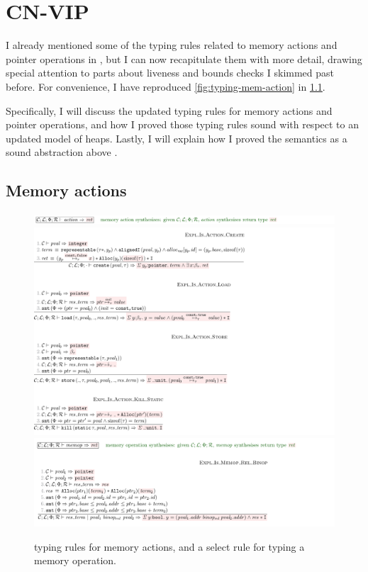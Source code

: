\chapter{CN-VIP}\label{chap:cn-vip}

\margintoc{}

I already mentioned some of the typing rules related to memory actions and
pointer operations in , but I can now
recapitulate them with more detail, drawing special attention to parts about
liveness and bounds checks I skimmed past before. For convenience, I have
reproduced \cref{fig:typing-mem-action} in \cref{fig:cnvip-mem-action}.

Specifically, I will discuss the updated typing rules for memory actions and
pointer operations, and how I proved those typing rules sound with respect to
an updated model of  heaps. Lastly, I will explain how I proved the
 semantics as a sound abstraction above .

\section{Memory actions}

\begin{figure}[tp]
    \includegraphics{figures/kernel-mem-action-typing-1}
    \includegraphics{figures/kernel-mem-action-typing-2}
    \includegraphics{figures/kernel-memop-typing}
    \caption{ typing rules for memory actions, and a select rule
        for typing a memory operation.}\label{fig:cnvip-mem-action}
\end{figure}

